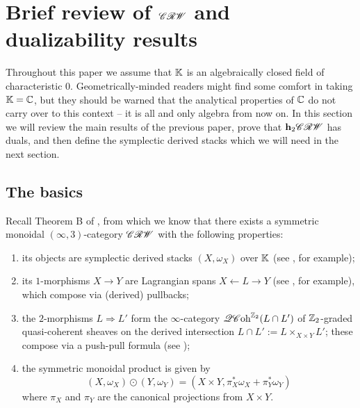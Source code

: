 \section{Brief review of $\mathscr{CRW}$ and dualizability results} \label{sec:crw}


Throughout this paper we assume that $\mathbb{K}$ is an algebraically closed field of characteristic $0$. Geometrically-minded readers might find some comfort in taking $\mathbb{K} = \mathbb{C}$, but they should be warned that the analytical properties of $\mathbb{C}$ do not carry over to this context -- it is all and only algebra from now on. In this section we will review the main results of the previous paper, prove that $\mathbf{h}_2 \mathscr{CRW}$ has duals, and then define the symplectic derived stacks which we will need in the next section.

\subsection{The basics}

Recall Theorem B of \cite{Riva2024}, from which we know that there exists a symmetric monoidal $(\infty,3)$-category $\mathscr{CRW}$ with the following properties:
\begin{enumerate}
	\item its objects are symplectic derived stacks $(X, \omega_X)$ over $\mathbb{K}$ (see \cite{PTVV2013}, for example);
	\item its $1$-morphisms $X \to Y$ are Lagrangian spans $X \leftarrow L \to Y$ (see \cite{Calaque2015}, for example), which compose via (derived) pullbacks;
	\item the $2$-morphisms $L \Rightarrow L'$ form the $\infty$-category $\mathscr{QC}\mathrm{oh}^{\mathbb{Z}_2}(L \cap L')$ of $\mathbb{Z}_2$-graded quasi-coherent sheaves on the derived intersection $L \cap L' := L \times_{X \times Y} L'$; these compose via a push-pull formula (see \cite[Section 1.2.1]{Riva2024});
	\item the symmetric monoidal product is given by
	\begin{equation*}
		(X, \omega_X) \odot (Y, \omega_Y) = (X \times Y, \pi_X^\ast \omega_X + \pi_Y^\ast \omega_Y)
	\end{equation*}
	where $\pi_X$ and $\pi_Y$ are the canonical projections from $X \times Y$.
\end{enumerate}

